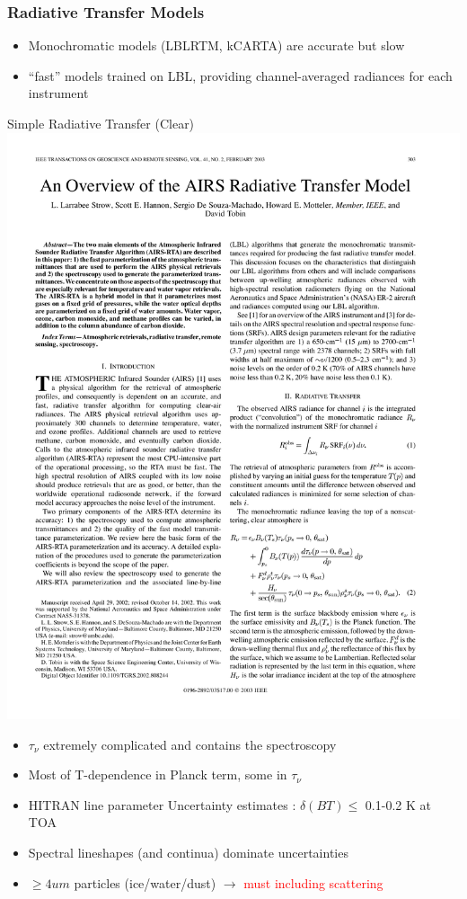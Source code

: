\documentclass[10pt,t]{beamer}
\begin{document}
\begin{frame}
  \frametitle{Radiative Transfer Models}
  \begin{itemize}
  \item Monochromatic models (LBLRTM, kCARTA) are accurate but slow
  \item ``fast'' models trained on LBL, providing channel-averaged radiances for each instrument
  \end{itemize}
  \begin{block}{Simple Radiative Transfer (Clear)}
    \centering \includegraphics[width=0.55\linewidth]{Figslls/simple_rta.pdf}
   \begin{small}
    \begin{itemize}
    \item $\tau_{\nu}$ extremely complicated and contains the spectroscopy
    \item Most of T-dependence in Planck term, some in $\tau_{\nu}$
    \item HITRAN line parameter Uncertainty estimates : $\delta(BT) \le$ 0.1-0.2 K at TOA  
    \item Spectral lineshapes (and continua) dominate uncertainties
    \item $\ge 4 um$ particles (ice/water/dust) $\rightarrow$ \textcolor{red}{must including scattering}
    \end{itemize}
 \end{small}
  \end{block}
\end{frame}
\end{document}
